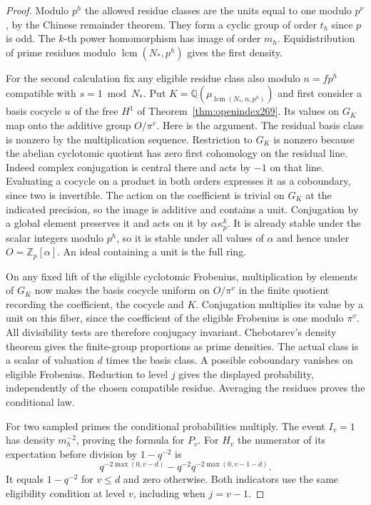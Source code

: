 \documentclass[a4paper,11pt]{article}
\theoremstyle{definition}
\theoremstyle{remark}
\numberwithin{equation}{section}
\begin{document}
\begin{proof}
Modulo \(p^h\) the allowed residue classes are the units equal
to one modulo \(p^\nu\), by the Chinese remainder theorem.
They form a cyclic group of order \(t_h\) since \(p\) is odd.
The \(k\)-th power homomorphism has image of order \(m_h\).
Equidistribution of prime residues modulo
\(\operatorname{lcm}(N_*,p^h)\) gives the first density.

For the second calculation fix any eligible residue class
also modulo \(n=fp^h\) compatible with \(s=1\bmod N_*\).
Put \(K=\mathbb Q(\mu_{\operatorname{lcm}(N_*,n,p^h)})\)
and first consider a basis cocycle \(u\) of the free
\(H^1\) of Theorem~\ref{thm:openindex269}.
Its values on \(G_K\) map onto the additive group \(O/\pi^v\).
Here is the argument. The residual basis class is nonzero
by the multiplication sequence. Restriction to \(G_K\) is
nonzero because the abelian cyclotomic quotient has zero
first cohomology on the residual line. Indeed complex
conjugation is central there and acts by \(-1\) on that
line. Evaluating a cocycle on a product in both orders
expresses it as a coboundary, since two is invertible.
The action on the coefficient is trivial on \(G_K\) at
the indicated precision, so the image is additive and
contains a unit. Conjugation by a global element preserves
it and acts on it by \(\alpha\kappa_p^k\). It is already
stable under the scalar integers modulo \(p^h\), so it
is stable under all values of \(\alpha\) and hence under
\(O=\mathbb Z_p[\alpha]\). An ideal containing a unit
is the full ring.

On any fixed lift of the eligible cyclotomic Frobenius,
multiplication by elements of \(G_K\) now makes the basis
cocycle uniform on \(O/\pi^v\) in the finite quotient
recording the coefficient, the cocycle and \(K\).
Conjugation multiplies its value by a unit on this
fiber, since the coefficient of the eligible Frobenius
is one modulo \(\pi^v\). All divisibility tests are
therefore conjugacy invariant. Chebotarev's density
theorem gives the finite-group proportions as prime
densities. The actual class is a scalar of valuation
\(d\) times the basis class. A possible coboundary
vanishes on eligible Frobenius. Reduction to level \(j\)
gives the displayed probability, independently of the
chosen compatible residue. Averaging the residues proves
the conditional law.

For two sampled primes the conditional probabilities multiply.
The event \(I_v=1\) has density \(m_h^{-2}\), proving the
formula for \(P_v\). For \(H_v\) the numerator of its
expectation before division by \(1-q^{-2}\) is
\[
        q^{-2\max(0,v-d)}
            -q^{-2}q^{-2\max(0,v-1-d)} .
\]
It equals \(1-q^{-2}\) for \(v\le d\) and zero otherwise.
Both indicators use the same eligibility condition at
level \(v\), including when \(j=v-1\).
\end{proof}
\end{document}
